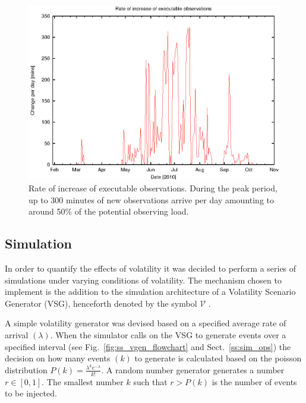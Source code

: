 \begin{figure}[htbp]
\begin{center}
    \includegraphics[scale=1.0, angle=0]{figures/volexec.eps}
\end{center}
\caption[Rate of increase of executable observations.]
{Rate of increase of executable observations. During the peak period, up to 300 minutes of new observations arrive per day amounting to around 50\% of the potential observing load.}
\label{fig:vol_execplot}
\end{figure}

\subsection{Simulation}
In order to quantify the effects of volatility it was decided to perform a series of simulations under varying conditions of volatility. The mechanism chosen to implement is the addition to the simulation architecture of a Volatility Scenario Generator (VSG), henceforth denoted by the symbol $\mathcal{V}$ .

A simple volatility generator was devised based on a specified average rate of arrival $(\lambda)$. When the simulator calls on the VSG to generate events over a specified interval (see Fig.~\ref{fig:ss_vgen_flowchart} and Sect.~\ref{ss:sim_ops}) the decision on how many events $(k)$ to generate is calculated based on the poisson distribution $P(k) = \frac{\lambda^k e^{-\lambda}}{k!}$. A random number generator generates a number $r \in [0,1]$. The smallest number $k$ such that $r > P(k)$ is the number of events to be injected.


